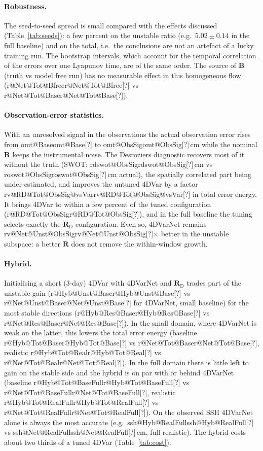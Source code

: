\documentclass[10pt,a4paper]{article}
\makeatletter
\newcommand{\pend}[1]{\textcolor{orange!80!black}{[#1]}}
\newcommand{\getnum}[1]{\ifcsname #1\endcsname\csname #1\endcsname\else\pend{?}\fi}
\newcommand{\ratio}[3]{\getnum{r@#1@#2@#3}}
\newcommand{\ratiov}[3]{\getnum{rv@#1@#2@#3}}
\newcommand{\ssh}[2]{\getnum{ssh@#1@#2}}
\newcommand{\omt}[1]{\getnum{omt@#1}}
\newcommand{\B}{\mathbf{B}}
\newcommand{\R}{\mathbf{R}}
\makeatother
\begin{document}
\begin{table}[t]\centering\small
\caption{Robustness of 4DVarNet to the training seed: mean $\pm$ standard deviation over seeds of the SSH RMSE and of
the error-energy ratios to .}\label{tab:seeds}

\end{table}

\paragraph{Robustness.} The seed-to-seed spread is small compared with the effects discussed
(Table~\ref{tab:seeds}): a few percent on the unstable ratio (e.g.\ $5.02\pm0.14$ in the full baseline) and on the
total, i.e.\ the conclusions are not an artefact of a lucky training run. The bootstrap intervals, which account for
the temporal correlation of the errors over one Lyapunov time, are of the same order. The source of $\B$ (truth vs
model free run) has no measurable effect in this homogeneous flow (\ratio{Net}{Tot}{Bfree} vs
\ratio{Net}{Tot}{Base}).

\paragraph{Observation-error statistics.} With an unresolved signal in the observations the actual observation error
rises from \omt{Base} to \omt{ObsSig}\,cm while the nominal $\R$ keeps the instrumental noise. The Desroziers
diagnostic recovers most of it without the truth (SWOT: \getnum{rdswot@ObsSig}\,cm vs \getnum{roswot@ObsSig}\,cm
actual), the spatially correlated part being under-estimated, and improves the untuned 4DVar by a factor
\getnum{rv@RD@Tot@ObsSig@vsVar} in total error energy. It brings 4DVar to within a few percent of the tuned
configuration (\ratio{RD}{Tot}{ObsSig}), and in the full baseline the tuning selects exactly the
$\R_{\mathrm D}$ configuration. Even so, 4DVarNet remains \ratiov{Net}{Unst}{ObsSig}$\times$ better in the unstable
subspace: a better $\R$ does not remove the within-window growth.

\paragraph{Hybrid.} Initialising a short (3-day) 4DVar with 4DVarNet and $\R_{\mathrm D}$ trades part of the unstable
gain (\ratio{Hyb}{Unst}{Base} vs \ratio{Net}{Unst}{Base} for 4DVarNet, small baseline) for the most stable directions
(\ratio{Hyb}{Res}{Base} vs \ratio{Net}{Res}{Base}). In the small domain, where 4DVarNet is weak on the latter, this
lowers the total error energy (baseline \ratio{Hyb}{Tot}{Base} vs \ratio{Net}{Tot}{Base}, realistic
\ratio{Hyb}{Tot}{Real} vs \ratio{Net}{Tot}{Real}). In the full domain there is little left to gain on the stable side
and the hybrid is on par with or behind 4DVarNet (baseline \ratio{Hyb}{Tot}{BaseFull} vs \ratio{Net}{Tot}{BaseFull},
realistic \ratio{Hyb}{Tot}{RealFull} vs \ratio{Net}{Tot}{RealFull}). On the observed SSH 4DVarNet alone is always
the most accurate (e.g.\ \ssh{Hyb}{RealFull} vs \ssh{Net}{RealFull}\,cm, full realistic). The hybrid costs about two
thirds of a tuned 4DVar (Table~\ref{tab:cost}).
\end{document}
